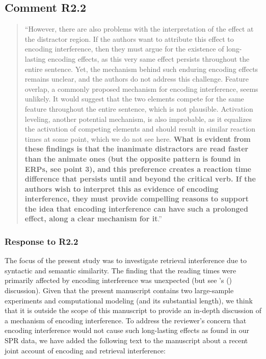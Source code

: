 \documentclass[12pt]{article}
\begin{document}
\subsection*{Comment R2.2}
\begin{quote}
``However, there are also problems with the interpretation of the effect at the distractor region. If the authors want to attribute this effect to encoding interference, then they must argue for the existence of long-lasting encoding effects, as this very same effect persists throughout the entire sentence. Yet, the mechanism behind such enduring encoding effects remains unclear, and the authors do not address this challenge. Feature overlap, a commonly proposed mechanism for encoding interference, seems unlikely. It would suggest that the two elements compete for the same feature throughout the entire sentence, which is not plausible. Activation leveling, another potential mechanism, is also improbable, as it equalizes the activation of competing elements and should result in similar reaction times at some point, which we do not see here. \textbf{What is evident from these findings is that the inanimate distractors are read faster than the animate ones (but the opposite pattern is found in ERPs, see point 3), and this preference creates a reaction time difference that persists until and beyond the critical verb. If the authors wish to interpret this as evidence of encoding interference, they must provide compelling reasons to support the idea that encoding interference can have such a prolonged effect, along a clear mechanism for it}.''
\end{quote}

\subsubsection*{Response to R2.2}
The focus of the present study was to investigate retrieval interference due to syntactic and semantic similarity. The finding that the reading times were primarily affected by encoding interference was unexpected (but see \citeauthor{mertzen}'s (\citeyear{mertzen}) discussion). Given that the present manuscript contains two large-sample experiments and computational modeling (and its substantial length), we think that it is outside the scope of this manuscript to provide an in-depth discussion of a mechanism of encoding interference. To address the reviewer's concern that encoding interference would not cause such long-lasting effects as found in our SPR data, we have added the following text to the manuscript about a recent joint account of encoding and retrieval interference:
\end{document}
